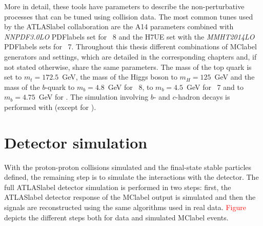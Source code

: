 More in detail, these tools have parameters to describe the non-perturbative processes that can be tuned using collision data. The most common tunes used by the \acrshort{ATLASlabel} collaboration are the A14 %
parameters combined with \textit{NNPDF3.0LO} \acrshort{PDFlabel}s set %
for \PYTHIA~8 and the H7UE set %
with the \textit{MMHT2014LO} \acrshort{PDFlabel}s sets %
for \HERWIG~7. Throughout this thesis different combinations of \acrshort{MClabel} generators and settings, which are detailed in the corresponding chapters and, if not stated otherwise, share the same parameters. The mass of the top quark is set to $m_t=172.5$~GeV, the mass of the Higgs boson to $m_H=125$~GeV and the mass of the $b$-quark to $m_b=4.8$~GeV for \PYTHIA~8, to $m_b=4.5$~GeV for \HERWIG~7 and to $m_b=4.75$~GeV for \SHERPA. The simulation involving $b$- and $c$-hadron decays is performed with \EVTGEN %
(except for \SHERPA). 

\section{Detector simulation}

With the proton-proton collisions simulated and the final-state stable particles defined, the remaining step is to simulate the interactions with the detector. The full \acrshort{ATLASlabel} detector simulation is performed in two steps: first, the \acrshort{ATLASlabel} detector response of the \acrshort{MClabel} output is simulated and then the signals are reconstructed using the same algorithms used in real data. \textcolor{red}{Figure} depicts the different steps both for data and simulated \acrshort{MClabel} events.

